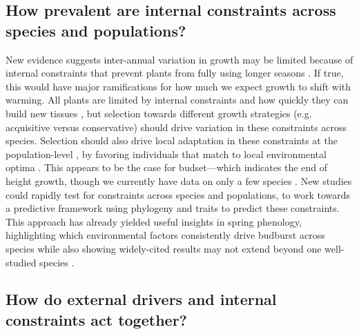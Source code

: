 \documentclass[11pt]{article}
\begin{document}


\subsection*{How prevalent are internal constraints across species and populations?}

New evidence suggests inter-annual variation in growth may be limited because of internal constraints that prevent plants from fully using longer seasons \citep{zohner2023effect}. If true, this would have major ramifications for how much we expect growth to shift with warming. All plants are limited by internal constraints and how quickly they can build new tissues \citep{marchand2021timing,luo2024internal}, but selection towards different growth strategies (e.g. acquisitive versus conservative) should drive variation in these constraints across species. Selection should also drive local adaptation in these constraints at the population-level \citep{mckown2016impacts,soolanayakanahally2013timing}, by favoring individuals that match to local environmental optima \citep{Colautti:2010,mckown2014np}. This appears to be the case for budset---which indicates the end of height growth, though we currently have data on only a few species \citep{aitken2016,zeng2024weak}. New studies could rapidly test for constraints across species and populations, to work towards a predictive framework using phylogeny and traits to predict these constraints. This approach has already yielded useful insights in spring phenology, highlighting which environmental factors consistently drive budburst across species while also showing widely-cited results may not extend beyond one well-studied species \citep{morales2024phylogenetic}. %

\subsection*{How do external drivers and internal constraints act together?}
\end{document}
